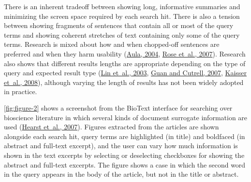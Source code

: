 \documentclass[sigconf,nonacm,screen,pbalance]{acmart}
\begin{document}
There is an inherent tradeoff between showing long, informative summaries and minimizing the screen
space required by each search hit. There is also a tension between showing fragments of sentences that
contain all or most of the query terms and showing coherent stretches of text containing only some of
the query terms. Research is mixed about how and when chopped-off sentences are preferred and when they
harm usability (\href{https://searchuserinterfaces.com/book/sui_references.html#aula2004ers}{Aula, 2004}, \href{https://searchuserinterfaces.com/book/sui_references.html#rose2007saa}{ Rose et~al., 2007}). Research
also shows that different results lengths are appropriate depending on the type of query and expected
result type (\href{https://searchuserinterfaces.com/book/sui_references.html#lin2003mga}{Lin et~al., 2003}, \href{https://searchuserinterfaces.com/book/sui_references.html#guan2007}{ Guan and Cutrell, 2007}, \href{https://searchuserinterfaces.com/book/sui_references.html#kaisser2008:isr}{ Kaisser et~al., 2008}), although varying the length of results has not been widely adopted in
practice.

\autoref{fig:figure-2}
shows a screenshot from the BioText interface for searching over bioscience literature in which several
kinds of document surrogate information are used (\href{https://searchuserinterfaces.com/book/sui_references.html#hearst2007bse}{Hearst et~al., 2007}). Figures extracted from the
articles are shown alongside each search hit, query terms are highlighted (in title) and boldfaced (in
abstract and full-text excerpt), and the user can vary how much information is shown in the text
excerpts by selecting or deselecting checkboxes for showing the abstract and full-text excerpts. The
figure shows a case in which the second word in the query appears in the body of the article, but not in
the title or abstract.
\end{document}
